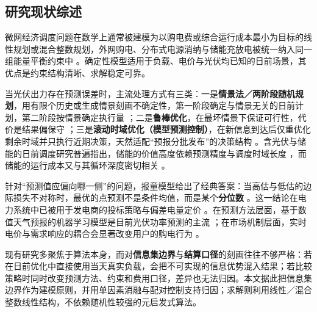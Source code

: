 \subsection{研究现状综述}

微网经济调度问题在数学上通常被建模为以购电费或综合运行成本最小为目标的线性规划或混合整数规划，外网购电、分布式电源消纳与储能充放电被统一纳入同一组能量平衡约束中 \cite{wu2014dynamic,nemati2018optimization}。确定性模型适用于负载、电价与光伏均已知的日前场景，其优点是约束结构清晰、求解稳定可靠。

当光伏出力存在预测误差时，主流处理方式有三类：一是\textbf{情景法／两阶段随机规划}，用有限个历史或生成情景刻画不确定性，第一阶段确定与情景无关的日前计划，第二阶段按情景确定执行量 \cite{wu2016solution,sun2025distributionally}；二是\textbf{鲁棒优化}，在最坏情景下保证可行性，代价是结果偏保守 \cite{zhang2018robust}；三是\textbf{滚动时域优化（模型预测控制）}，在新信息到达后仅重优化剩余时域并只执行近期决策，天然适配“预报分批发布”的决策结构 \cite{elkazaz2020energy,silva2020optimal}。含光伏与储能的日前调度研究普遍指出，储能的价值高度依赖预测精度与调度时域长度 \cite{luo2020optimal}，而储能的运行成本又与其循环深度密切相关 \cite{maheshwari2020optimizing}。

针对“预测值应偏向哪一侧”的问题，报童模型给出了经典答案：当高估与低估的边际损失不对称时，最优的点预测不是条件均值，而是某个\textbf{分位数} \cite{qin2011newsvendor}。这一结论在电力系统中已被用于发电商的投标策略与偏差电量定价 \cite{polat2024renewable}。在预测方法层面，基于数值天气预报的机器学习模型是目前光伏功率预测的主流 \cite{markovics2022comparison}；在市场机制层面，实时电价与需求响应的耦合会显著改变用户的购电行为 \cite{wang2015review}。

现有研究多聚焦于算法本身，而对\textbf{信息集边界}与\textbf{结算口径}的刻画往往不够严格：若在日前优化中直接使用当天真实负载，会把不可实现的信息优势混入结果；若比较策略时同时改变预测方法、约束和费用口径，差异也无法归因。本文据此把信息集边界作为建模原则，并用单因素消融与配对控制支持归因；求解则利用线性／混合整数线性结构，不依赖随机性较强的元启发式算法。
